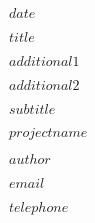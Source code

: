 \begin{titlepage}


\vspace*{8cm}

\hspace*{2cm}
$date$

\hspace*{2cm}
{\Huge \textbf{\textcolor{swisstphblue}{$title$}} \par} %

\vspace{1cm}

\hspace*{2cm}
{\Huge \textbf{\textcolor{swisstphblue}{$additional1$}} \par} %

\hspace*{2cm}
{\Huge \textbf{\textcolor{swisstphblue}{$additional2$}} \par} %

\vspace{0.5cm}

\hspace*{2cm}
{\huge {\textcolor{swisstphred}{$subtitle$}} \par} %

\hspace*{2cm}
{\huge {\textcolor{swisstphred}{$projectname$}} \par} %

\vspace{0.5cm}

\hspace*{2cm}
{\large \textbf{$author$}} %

\hspace*{2cm}
{\large $email$} %

\hspace*{2cm}
{\large $telephone$} %


\end{titlepage}
